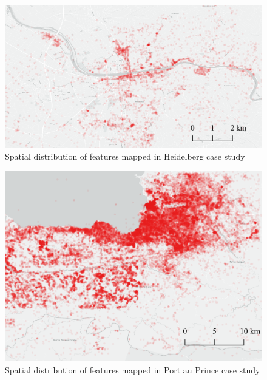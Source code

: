 \begin{figure}[H] %
    \centering %
    \includegraphics[width = \textwidth]{Images/hed_2.png} %
    \caption{Spatial distribution of features mapped in Heidelberg case study} %
\end{figure}


\begin{figure} %
    \centering %
    \includegraphics[width = \textwidth]{Images/pap_2.png} %
    \caption{Spatial distribution of features mapped in Port au Prince case study} %
\end{figure}

